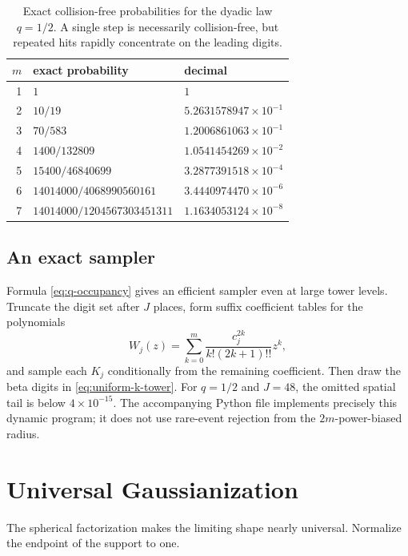 \documentclass[11pt,oneside]{article}
\theoremstyle{definition}
\theoremstyle{remark}
\begin{document}
\begin{table}[ht]
\centering
\caption{Exact collision-free probabilities for the dyadic law $q=1/2$.  A
single step is necessarily collision-free, but repeated hits rapidly
concentrate on the leading digits.}
\label{tab:collision-free}
\small
\begin{tabular}{@{}rll@{}}
\toprule
$m$ & exact probability & decimal \\
\midrule
1 & $1$ & $1$ \\
2 & $10/19$ & $5.2631578947\times10^{-1}$ \\
3 & $70/583$ & $1.2006861063\times10^{-1}$ \\
4 & $1400/132809$ & $1.0541454269\times10^{-2}$ \\
5 & $15400/46840699$ & $3.2877391518\times10^{-4}$ \\
6 & $14014000/4068990560161$ & $3.4440974470\times10^{-6}$ \\
7 & $14014000/1204567303451311$ & $1.1634053124\times10^{-8}$ \\
\bottomrule
\end{tabular}
\end{table}

\subsection{An exact sampler}

Formula \eqref{eq:q-occupancy} gives an efficient sampler even at large tower
levels.  Truncate the digit set after $J$ places, form suffix coefficient tables
for the polynomials
\begin{equation}
 W_j(z)=\sum_{k=0}^{m}\frac{c_j^{2k}}{k!(2k+1)!!}z^k,            \label{eq:Wj}
\end{equation}
and sample each $K_j$ conditionally from the remaining coefficient.  Then draw
the beta digits in \eqref{eq:uniform-k-tower}.  For $q=1/2$ and $J=48$, the
omitted spatial tail is below $4\times10^{-15}$.  The accompanying Python file
implements precisely this dynamic program; it does not use rare-event
rejection from the $2m$-power-biased radius.

\section{Universal Gaussianization}
\label{sec:universal-Gaussian}

The spherical factorization makes the limiting shape nearly universal.
Normalize the endpoint of the support to one.
\end{document}
